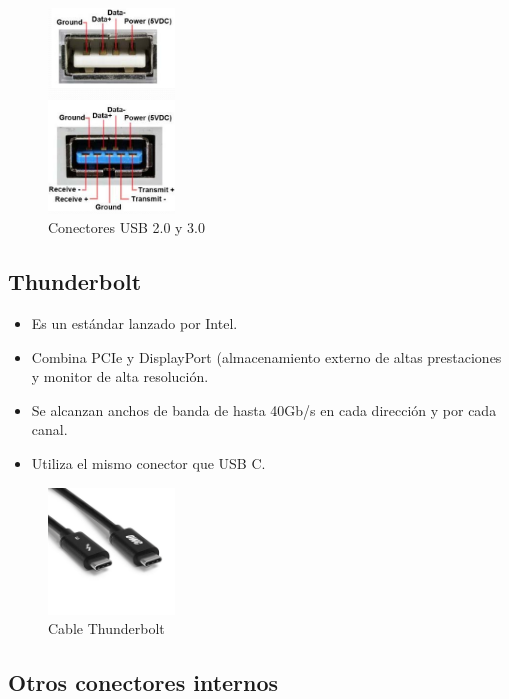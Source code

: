 \documentclass[12pt,spanish]{article}
\begin{document}
\begin{figure}[H]
	\centering
	\includegraphics[width=0.3\textwidth]{usb.png}
	\caption{Conectores USB 2.0 y 3.0}
\end{figure}

\subsection{Thunderbolt}

\begin{itemize}
	\item Es un estándar lanzado por Intel.
	\item Combina PCIe y DisplayPort (almacenamiento externo de altas prestaciones y monitor de alta resolución.
	\item Se alcanzan anchos de banda de hasta 40Gb/s en cada dirección y por cada canal.
	\item Utiliza el mismo conector que USB C.
\end{itemize}


\begin{figure}[H]
	\centering
	\includegraphics[width=0.3\textwidth]{thunderbolt.png}
	\caption{Cable Thunderbolt}
\end{figure}

\subsection{Otros conectores internos}
\end{document}
